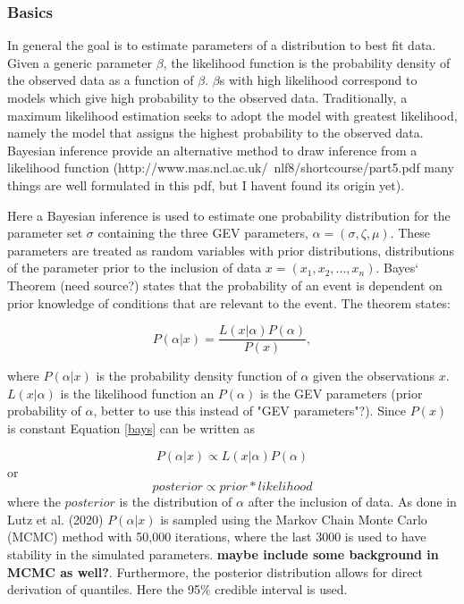 \subsubsection{Basics}
In general the goal is to estimate parameters of a distribution to best fit data. Given a generic parameter $\beta$, the likelihood function is the probability density of the observed data as a function of $\beta$. $\beta$s with high likelihood correspond to models which give high probability to the observed data. Traditionally, a maximum likelihood estimation seeks to adopt the model with greatest likelihood, namely the model that assigns the highest probability to the observed data. Bayesian inference provide an alternative method to draw inference from a likelihood function (http://www.mas.ncl.ac.uk/~nlf8/shortcourse/part5.pdf many things are well formulated in this pdf, but I havent found its origin yet). 

Here a Bayesian inference is used to estimate one probability distribution for the parameter set $\sigma$ containing the three GEV parameters, $\alpha = (\sigma, \zeta, \mu)$. These parameters are treated as random variables with prior distributions, distributions of the parameter prior to the inclusion of data $x = (x_1, x_2,...,x_n)$. Bayes` Theorem (need source?) states that the probability of an event is dependent on prior knowledge of conditions that are relevant to the event. The theorem states:

\begin{equation}
P(\alpha \vert x) = \frac{L(x \vert \alpha)P(\alpha)}{P(x)},
\label{bays}
\end{equation}

where $P(\alpha \vert x)$ is the probability density function of $\alpha$ given the observations $x$. $L(x \vert \alpha)$ is the likelihood function an $P(\alpha)$ is the GEV parameters (prior probability of $\alpha$, better to use this instead of "GEV parameters"?). Since $P(x)$ is constant Equation \eqref{bays} can be written as 

\begin{equation}
P(\alpha \vert x)\propto L(x \vert \alpha)P(\alpha)
\end{equation}  
or
\begin{equation}
posterior \propto prior * likelihood
\end{equation}
where the $posterior$ is the distribution of $\alpha$ after the inclusion of data. As done in Lutz et al. (2020) $P(\alpha \vert x)$ is sampled using the Markov Chain Monte Carlo (MCMC) method with 50,000 iterations, where the last 3000 is used to have stability in the simulated parameters. \textbf{maybe include some background in MCMC as well?}. Furthermore, the posterior distribution allows for direct derivation of quantiles. Here the 95\% credible interval is used. 


